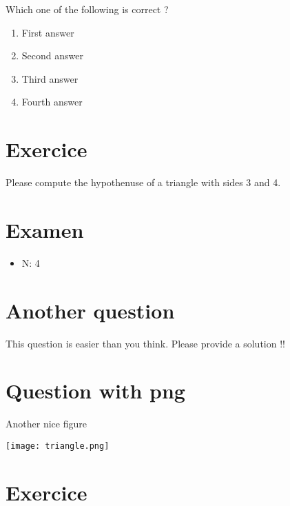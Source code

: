 \documentclass[a4paper,11pt,twoside]{article}
\begin{document}
Which one of the following is correct ?

\begin{enumerate}
\item First answer
\item Second answer
\item Third answer
\item Fourth answer
\end{enumerate}



\section*{Exercice}
\label{sec:org38275d5}

Please compute the hypothenuse of a triangle with sides 3 and 4.



\subsection*{}
\label{sec:org06e0e75}

\cleardoublepage

\section*{Examen}
\label{sec:orgd00662b}
\begin{itemize}
\item N: 4
\end{itemize}
\section*{Another question}
\label{sec:org9473f0d}

This question is easier than you think. Please provide a solution !!



\section*{Question with png}
\label{sec:org4eb3644}

Another nice figure

\begin{center}
\texttt{[image: triangle.png]}
\end{center}



\section*{Exercice}
\label{sec:org7ec9c37}
\end{document}
